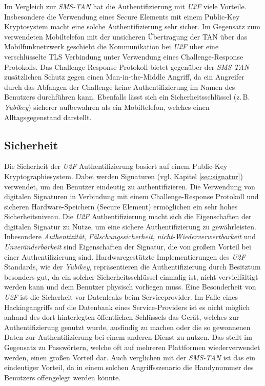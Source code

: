 \documentclass[11pt,a4paper,ngerman]{scrreprt}
\begin{document}
Im Vergleich zur \textit{SMS-TAN} hat die Authentifizierung mit \textit{U2F} viele Vorteile. Insbesondere die Verwendung eines Secure Elements mit einem Public-Key Kryptosystem macht eine solche Authentifizierung sehr sicher. Im Gegensatz zum verwendeten Mobiltelefon mit der unsicheren Übertragung der TAN über das Mobilfunknetzwerk geschieht die Kommunikation bei \textit{U2F} über eine verschlüsselte TLS Verbindung unter Verwendung eines Challenge-Response Protokolls. Das Challenge-Response Protokoll bietet gegenüber der \textit{SMS-TAN} zusätzlichen Schutz gegen einen Man-in-the-Middle Angriff, da ein Angreifer durch das Abfangen der Challenge keine Authentifizierung im Namen des Benutzers durchführen kann. Ebenfalls lässt sich ein Sicherheitsschlüssel (z.\,B. \textit{Yubikey}) sicherer aufbewahren als ein Mobiltelefon, welches einen Alltagsgegenstand darstellt.
\subsection{Sicherheit}
Die Sicherheit der \textit{U2F} Authentifizierung basiert auf einem Public-Key Kryptographiesystem. Dabei werden Signaturen (vgl. Kapitel \ref{sec:signatur}) verwendet, um den Benutzer eindeutig zu authentifizieren. Die Verwendung von digitalen Signaturen in Verbindung mit einem Challenge-Response Protokoll und sicheren Hardware-Speichern (Secure Element) ermöglichen ein sehr hohes Sicherheitsniveau. Die \textit{U2F} Authentifizierung macht sich die Eigenschaften der digitalen Signatur zu Nutze, um eine sichere Authentifizierung zu gewährleisten. Inbesondere \emph{Authentizität}, \emph{Fälschungssicherheit}, \emph{nicht-Wiederverwertbarkeit} und \emph{Unveränderbarkeit} sind Eigenschaften der Signatur, die von großem Vorteil bei einer Authentifizierung sind. Hardwaregestützte Implementierungen des \textit{U2F} Standards, wie der \textit{Yubikey}, repräsentieren die Authentifizierung durch Besitztum besonders gut, da ein solcher Sicherheitsschlüssel einmalig ist, nicht vervielfältigt werden kann und dem Benutzer physisch vorliegen muss. Eine Besonderheit von \textit{U2F} ist die Sicherheit vor Datenleaks beim Serviceprovider. Im Falle eines Hackingangriffs auf die Datenbank eines Service-Providers ist es nicht möglich anhand des dort hinterlegten öffentlichen Schlüssels das Gerät, welches zur Authentifizierung genutzt wurde, ausfindig zu machen oder die so gewonnenen Daten zur Authentifizierung bei einem anderen Dienst zu nutzen. Das stellt im Gegensatz zu Passwörtern, welche oft auf mehreren Plattformen wiederverwendet werden, einen großen Vorteil dar. Auch verglichen mit der \textit{SMS-TAN} ist das ein eindeutiger Vorteil, da in einem solchen Angriffsszenario die Handynummer des Benutzers offengelegt werden könnte.
\end{document}
